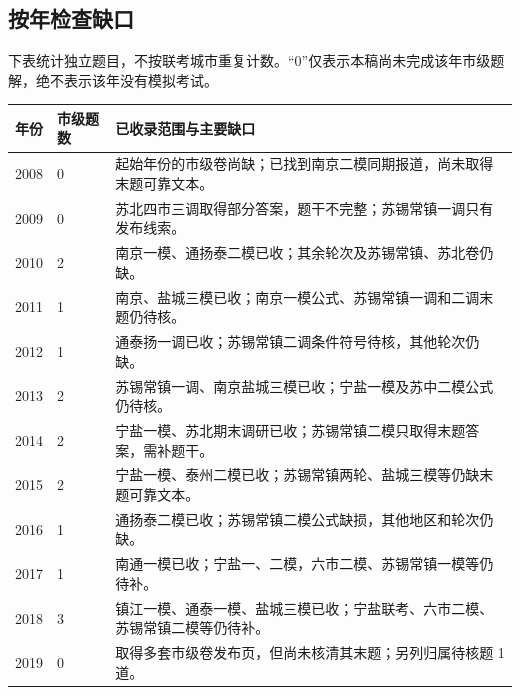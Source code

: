 \documentclass[UTF8,12pt,a4paper,fontset=fandol]{ctexart}
\begin{document}
\subsection{按年检查缺口}
下表统计独立题目，不按联考城市重复计数。“0”仅表示本稿尚未完成该年市级题解，绝不表示该年没有模拟考试。
\begin{longtable}{p{}p{}p{}}
\textbf{年份}&\textbf{市级题数}&\textbf{已收录范围与主要缺口}\\\hline
2008&0&起始年份的市级卷尚缺；已找到南京二模同期报道，尚未取得末题可靠文本。\\
2009&0&苏北四市三调取得部分答案，题干不完整；苏锡常镇一调只有发布线索。\\
2010&2&南京一模、通扬泰二模已收；其余轮次及苏锡常镇、苏北卷仍缺。\\
2011&1&南京、盐城三模已收；南京一模公式、苏锡常镇一调和二调末题仍待核。\\
2012&1&通泰扬一调已收；苏锡常镇二调条件符号待核，其他轮次仍缺。\\
2013&2&苏锡常镇一调、南京盐城三模已收；宁盐一模及苏中二模公式仍待核。\\
2014&2&宁盐一模、苏北期末调研已收；苏锡常镇二模只取得末题答案，需补题干。\\
2015&2&宁盐一模、泰州二模已收；苏锡常镇两轮、盐城三模等仍缺末题可靠文本。\\
2016&1&通扬泰二模已收；苏锡常镇二模公式缺损，其他地区和轮次仍缺。\\
2017&1&南通一模已收；宁盐一、二模，六市二模、苏锡常镇一模等仍待补。\\
2018&3&镇江一模、通泰一模、盐城三模已收；宁盐联考、六市二模、苏锡常镇二模等仍待补。\\
2019&0&取得多套市级卷发布页，但尚未核清其末题；另列归属待核题 1 道。\\\hline
\end{longtable}
\end{document}
